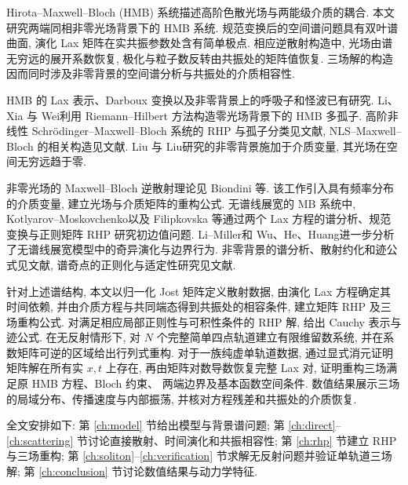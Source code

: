 
Hirota--Maxwell--Bloch (HMB) 系统描述高阶色散光场与两能级介质的耦合\cite{PN1995,LHP2013}.
本文研究两端同相非零光场背景下的 HMB 系统. 规范变换后的空间谱问题具有双叶谱曲面,
演化 Lax 矩阵在实共振参数处含有简单极点. 相应逆散射构造中,
光场由谱无穷远的展开系数恢复, 极化与粒子数反转由共振处的矩阵值恢复.
三场解的构造因而同时涉及非零背景的空间谱分析与共振处的介质相容性.

HMB 的 Lax 表示、Darboux 变换以及非零背景上的呼吸子和怪波已有研究\cite{LHP2013,ZZ2026}.
Li、Xia 与 Wei\cite{LXW2021}利用 Riemann--Hilbert 方法构造零光场背景下的 HMB 多孤子.
高阶非线性 Schr\"odinger--Maxwell--Bloch 系统的 RHP 与孤子分类见文献\cite{LTPY2020,Guo2022},
NLS--Maxwell--Bloch 的相关构造见文献\cite{LZX2021}.
Liu 与 Liu\cite{LL2026}研究的非零背景施加于介质变量, 其光场在空间无穷远趋于零.

非零光场的 Maxwell--Bloch 逆散射理论见 Biondini 等\cite{BGKL2019}.
该工作引入具有频率分布的介质变量, 建立光场与介质矩阵的重构公式.
无谱线展宽的 MB 系统中, Kotlyarov--Moskovchenko\cite{KM2014}以及
Filipkovska 等\cite{FKM2017}通过两个 Lax 方程的谱分析、规范变换与正则矩阵 RHP 研究初边值问题.
Li--Miller\cite{LM2024}和 Wu、He、Huang\cite{WHH2025}进一步分析了无谱线展宽模型中的奇异演化与边界行为.
非零背景的谱分析、散射约化和迹公式见文献\cite{Fan2022,ZhangFan2020,ZCY2020},
谱奇点的正则化与适定性研究见文献\cite{BM2019,BPZ2024}.

针对上述谱结构, 本文以归一化 Jost 矩阵定义散射数据, 由演化 Lax 方程确定其时间依赖,
并由介质方程与共同端态得到共振处的相容条件, 建立矩阵 RHP 及三场重构公式.
对满足相应局部正则性与可积性条件的 RHP 解, 给出 Cauchy 表示与迹公式.
在无反射情形下, 对 $N$ 个完整简单四点轨道建立有限维留数系统,
并在系数矩阵可逆的区域给出行列式重构.
对于一族纯虚单轨道数据, 通过显式消元证明矩阵解在所有实 $x,t$ 上存在,
再由矩阵对数导数恢复完整 Lax 对, 证明重构三场满足原 HMB 方程、Bloch 约束、
两端边界及基本函数空间条件. 数值结果展示三场的局域分布、传播速度与内部振荡,
并核对方程残差和共振处的介质恢复.

全文安排如下: 第 \ref{ch:model} 节给出模型与背景谱问题;
第 \ref{ch:direct}--\ref{ch:scattering} 节讨论直接散射、时间演化和共振相容性;
第 \ref{ch:rhp} 节建立 RHP 与三场重构;
第 \ref{ch:soliton}--\ref{ch:verification} 节求解无反射问题并验证单轨道三场解;
第 \ref{ch:conclusion} 节讨论数值结果与动力学特征.
